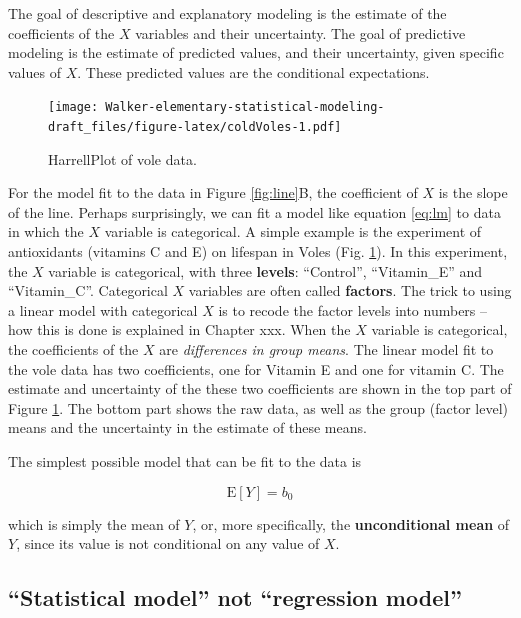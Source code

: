 \documentclass[]{book}
\theoremstyle{definition}
\theoremstyle{definition}
\theoremstyle{definition}
\theoremstyle{remark}
\begin{document}
The goal of descriptive and explanatory modeling is the estimate of the
coefficients of the \(X\) variables and their uncertainty. The goal of
predictive modeling is the estimate of predicted values, and their
uncertainty, given specific values of \(X\). These predicted values are
the conditional expectations.

\begin{figure}
\centering
\texttt{[image: Walker-elementary-statistical-modeling-draft\_files/figure-latex/coldVoles-1.pdf]}
\caption{\label{fig:coldVoles}HarrellPlot of vole data.}
\end{figure}

For the model fit to the data in Figure \ref{fig:line}B, the coefficient
of \(X\) is the slope of the line. Perhaps surprisingly, we can fit a
model like equation \eqref{eq:lm} to data in which the \(X\) variable is
categorical. A simple example is the experiment of antioxidants
(vitamins C and E) on lifespan in Voles (Fig. \ref{fig:coldVoles}). In
this experiment, the \(X\) variable is categorical, with three
\textbf{levels}: ``Control'', ``Vitamin\_E'' and ``Vitamin\_C''.
Categorical \(X\) variables are often called \textbf{factors}. The trick
to using a linear model with categorical \(X\) is to recode the factor
levels into numbers -- how this is done is explained in Chapter xxx.
When the \(X\) variable is categorical, the coefficients of the \(X\)
are \emph{differences in group means}. The linear model fit to the vole
data has two coefficients, one for Vitamin E and one for vitamin C. The
estimate and uncertainty of the these two coefficients are shown in the
top part of Figure \ref{fig:coldVoles}. The bottom part shows the raw
data, as well as the group (factor level) means and the uncertainty in
the estimate of these means.

The simplest possible model that can be fit to the data is

\begin{equation}
\mathrm{E}[Y] = b_0
\label{eq:unconditional}
\end{equation}

which is simply the mean of \(Y\), or, more specifically, the
\textbf{unconditional mean} of \(Y\), since its value is not conditional
on any value of \(X\).

\subsection{\texorpdfstring{``Statistical model'' not ``regression
model''}{Statistical model not regression model}}\label{statistical-model-not-regression-model}
\end{document}
